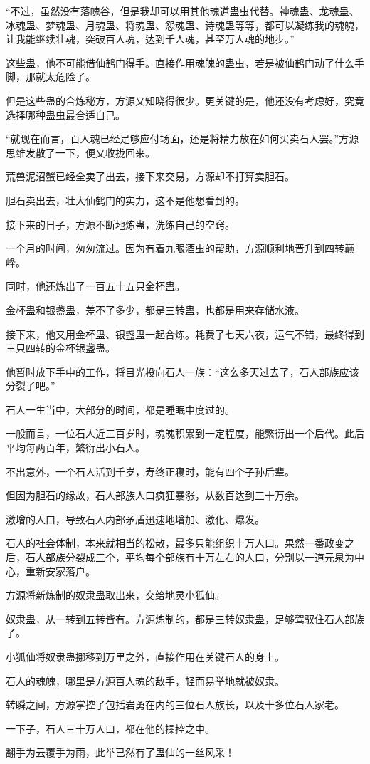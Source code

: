 \begin{this_body}
“不过，虽然没有落魄谷，但是我却可以用其他魂道蛊虫代替。神魂蛊、龙魂蛊、冰魂蛊、梦魂蛊、月魂蛊、将魂蛊、怨魂蛊、诗魂蛊等等，都可以凝练我的魂魄，让我能继续壮魂，突破百人魂，达到千人魂，甚至万人魂的地步。”

这些蛊，他不可能借仙鹤门得手。直接作用魂魄的蛊虫，若是被仙鹤门动了什么手脚，那就太危险了。

但是这些蛊的合炼秘方，方源又知晓得很少。更关键的是，他还没有考虑好，究竟选择哪种蛊虫最合适自己。

“就现在而言，百人魂已经足够应付场面，还是将精力放在如何买卖石人罢。”方源思维发散了一下，便又收拢回来。

荒兽泥沼蟹已经全卖了出去，接下来交易，方源却不打算卖胆石。

胆石卖出去，壮大仙鹤门的实力，这不是他想看到的。

接下来的日子，方源不断地炼蛊，洗练自己的空窍。

一个月的时间，匆匆流过。因为有着九眼酒虫的帮助，方源顺利地晋升到四转巅峰。

同时，他还炼出了一百五十五只金杯蛊。

金杯蛊和银盏蛊，差不了多少，都是三转蛊，也都是用来存储水液。

接下来，他又用金杯蛊、银盏蛊一起合炼。耗费了七天六夜，运气不错，最终得到三只四转的金杯银盏蛊。

他暂时放下手中的工作，将目光投向石人一族：“这么多天过去了，石人部族应该分裂了吧。”

石人一生当中，大部分的时间，都是睡眠中度过的。

一般而言，一位石人近三百岁时，魂魄积累到一定程度，能繁衍出一个后代。此后平均每两百年，繁衍出小石人。

不出意外，一个石人活到千岁，寿终正寝时，能有四个子孙后辈。

但因为胆石的缘故，石人部族人口疯狂暴涨，从数百达到三十万余。

激增的人口，导致石人内部矛盾迅速地增加、激化、爆发。

石人的社会体制，本来就相当的松散，最多只能组织十万人口。果然一番政变之后，石人部族分裂成三个，平均每个部族有十万左右的人口，分别以一道元泉为中心，重新安家落户。

方源将新炼制的奴隶蛊取出来，交给地灵小狐仙。

奴隶蛊，从一转到五转皆有。方源炼制的，都是三转奴隶蛊，足够驾驭住石人部族了。

小狐仙将奴隶蛊挪移到万里之外，直接作用在关键石人的身上。

石人的魂魄，哪里是方源百人魂的敌手，轻而易举地就被奴隶。

转瞬之间，方源掌控了包括岩勇在内的三位石人族长，以及十多位石人家老。

一下子，石人三十万人口，都在他的操控之中。

翻手为云覆手为雨，此举已然有了蛊仙的一丝风采！

\end{this_body}

